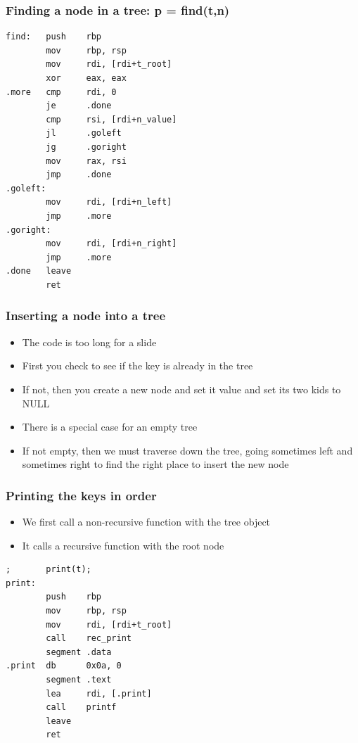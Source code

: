 \documentclass{beamer}
\begin{document}
\begin{frame}[fragile]
    \frametitle{Finding a node in a tree: p = find(t,n)}
\small
\begin{verbatim}
find:   push    rbp
        mov     rbp, rsp
        mov     rdi, [rdi+t_root]
        xor     eax, eax
.more   cmp     rdi, 0
        je      .done
        cmp     rsi, [rdi+n_value]
        jl      .goleft
        jg      .goright
        mov     rax, rsi
        jmp     .done
.goleft:
        mov     rdi, [rdi+n_left]
        jmp     .more
.goright:
        mov     rdi, [rdi+n_right]
        jmp     .more
.done   leave
        ret
\end{verbatim}
\end{frame}

\begin{frame}
    \frametitle{Inserting a node into a tree}
    \begin{itemize}
        \item The code is too long for a slide
        \item First you check to see if the key is already in the tree
        \item If not, then you create a new node and set it value and
              set its two kids to NULL
        \item There is a special case for an empty tree
        \item If not empty, then we must traverse down the tree, going
              sometimes left and sometimes right to find the right place
              to insert the new node
    \end{itemize}
\end{frame}

\begin{frame}[fragile]
    \frametitle{Printing the keys in order}
    \begin{itemize}
        \item We first call a non-recursive function with the tree object
        \item It calls a recursive function with the root node
    \end{itemize}
\begin{verbatim}
;       print(t);
print:
        push    rbp
        mov     rbp, rsp
        mov     rdi, [rdi+t_root]
        call    rec_print
        segment .data
.print  db      0x0a, 0
        segment .text
        lea     rdi, [.print]
        call    printf
        leave
        ret
\end{verbatim}
\end{frame}
\end{document}
